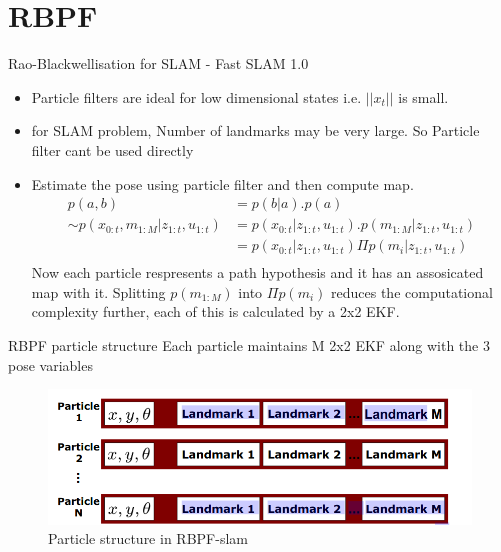 \documentclass{beamer}
\begin{document}
\section{RBPF}
\begin{frame}{Rao-Blackwellisation for SLAM - Fast SLAM 1.0}
    \begin{itemize}
        \item Particle filters are ideal for low dimensional states i.e. $|| x_t ||$ is small.
        \item for SLAM problem, Number of landmarks may be very large. So Particle filter cant be used directly
        \item Estimate the pose using particle filter and then compute map. 
\begin{align*}
    p(a,b) & = p(b|a).p(a)\\
    \sim p(x_{0:t},m_{1:M}|z_{1:t},u_{1:t}) & =  p(x_{0:t}|z_{1:t},u_{1:t}).p(m_{1:M}|z_{1:t},u_{1:t})\\
    & =  p(x_{0:t}|z_{1:t},u_{1:t}) \Pi p(m_{i}|z_{1:t},u_{1:t})\\
\end{align*}
Now each particle respresents a path hypothesis and it has an assosicated map with it. Splitting $p(m_{1:M})$ into $\Pi p(m_i)$ reduces the computational complexity further, each of this is calculated by a 2x2 EKF. 
\newline 
    \end{itemize}
\end{frame}


\begin{frame}{RBPF particle structure}
    Each particle maintains M 2x2 EKF along with the 3 pose variables 
\begin{figure}
    \includegraphics[width = \linewidth]{./RBPF_particles.png}
    \caption{Particle structure in RBPF-slam}
\end{figure}

\end{frame}
\end{document}
